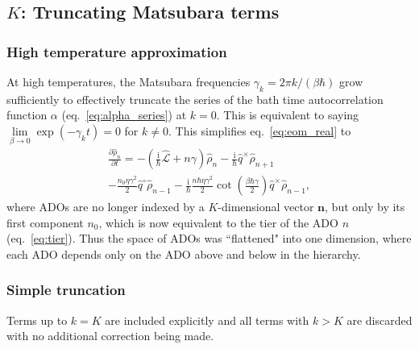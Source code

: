\subsection{$K$: Truncating Matsubara terms}\label{subsec:K_truncation}
\subsubsection{High temperature approximation}
At high temperatures, the Matsubara frequencies $\gamma_k = 2\pi k/(\beta\hbar)$ grow sufficiently to effectively truncate the series of the bath time autocorrelation function $\alpha$ (eq.~\ref{eq:alpha_series}) at $k=0$. This is equivalent to saying $\lim\limits_{\beta \to 0}\exp(-\gamma_{k} t) = 0$ for $k\neq 0$. This simplifies eq.~\ref{eq:eom_real} to
\begin{multline}
\frac{\partial \hat{\rho}_{n} }{\partial t} =
-\left(\frac{\mathrm{i}}{\hbar}\hat{\mathcal{L}}+n \gamma \right)\hat{\rho}_{n}
-\frac{\mathrm{i}}{\hbar}\hat{q}^\times \hat{\rho}_{n +1} \\
-\frac{n_0 \eta\gamma^2}{2}\hat{q}^\circ\hat{\rho}_{n -1}
-\frac{\mathrm{i}}{\hbar}\frac{n \hbar \eta \gamma^2}{2}\cot\left(\frac{\beta\hbar\gamma}{2}\right)\hat{q}^\times\hat{\rho}_{n -1},
\label{eq:qheom_high_temp}
\end{multline}
where ADOs are no longer indexed by a $K$-dimensional vector $\bm{n}$, but only by its first component $n_0$, which is now equivalent to the tier of the ADO $n$ (eq.~\ref{eq:tier}). Thus the space of ADOs was ``flattened" into one dimension, where each ADO depends only on the ADO above and below in the hierarchy.
\subsubsection{Simple truncation}
Terms up to $k=K$ are included explicitly and all terms with $k>K$ are discarded with no additional correction being made.
